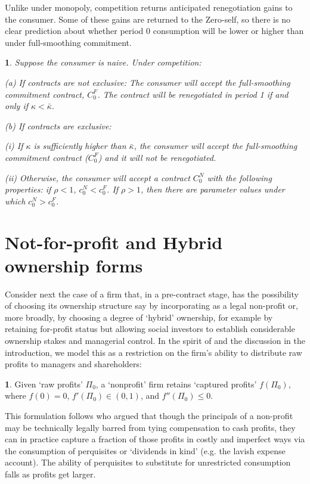 \documentclass[11pt,english]{article}
\theoremstyle{plain}
\newtheorem{prop}{\protect\propositionname}
\theoremstyle{definition}
\newtheorem*{defn*}{\protect\definitionname}
\providecommand{\definitionname}{Definition}
\providecommand{\propositionname}{Proposition}
\begin{document}
Unlike under monopoly, competition returns anticipated renegotiation
gains to the consumer. Some of these gains are returned to the Zero-self,
so there is no clear prediction about whether period 0 consumption
will be lower or higher than under full-smoothing commitment. 
\begin{prop}
Suppose the consumer is naive. Under competition:

(a) If contracts are not exclusive: The consumer will accept the full-smoothing
commitment contract, $C_{0}^{F}$. The contract will be renegotiated
in period 1 if and only if $\kappa<\bar{\kappa}$.

(b) If contracts are exclusive:

(i) If $\kappa$ is sufficiently higher than $\bar{\kappa}$, the
consumer will accept the full-smoothing commitment contract ($C_{0}^{F}$)
and it will not be renegotiated.

(ii) Otherwise, the consumer will accept a contract $C_{0}^{N}$ with
the following properties: if $\rho<1$, $c_{0}^{N}<c_{0}^{F}$. If
$\rho>1$, then there are parameter values under which $c_{0}^{N}>c_{0}^{F}$. 
\end{prop}

\section{Not-for-profit and Hybrid ownership forms}

\label{nonprofits}

Consider next the case of a firm that, in a pre-contract stage, has
the possibility of choosing its ownership structure say by incorporating
as a legal non-profit or, more broadly, by choosing a degree of `hybrid'
ownership, for example by retaining for-profit status but allowing
social investors to establish considerable ownership stakes and managerial
control. In the spirit of \citet{hansmann1996a} and the discussion
in the introduction, we model this as a restriction on the firm's
ability to distribute raw profits to managers and shareholders: 
\begin{defn*}
Given `raw profits' $\Pi_{0}$, a `nonprofit' firm retains `captured
profits' $f\left(\Pi_{0}\right)$, where $f\left(0\right)=0$, $f'\left(\Pi_{0}\right)\in\left(0,1\right)$,
and $f''\left(\Pi_{0}\right)\leq0.$ 
\end{defn*}
This formulation follows \citet{glaeser2001} who argued that though
the principals of a non-profit may be technically legally barred from
tying compensation to cash profits, they can in practice capture a
fraction of those profits in costly and imperfect ways via the consumption
of perquisites or `dividends in kind' (e.g. the lavish expense account).
The ability of perquisites to substitute for unrestricted consumption
falls as profits get larger.
\end{document}
